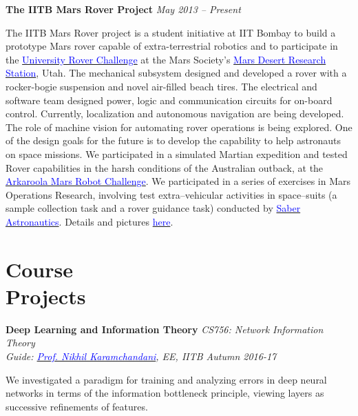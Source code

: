 \documentclass[margin,line]{res}
\newenvironment{list1}{
  \begin{list}{\ding{113}}{%
      \setlength{\itemsep}{0in}
      \setlength{\parsep}{0in} \setlength{\parskip}{0in}
      \setlength{\topsep}{0in} \setlength{\partopsep}{0in} 
      \setlength{\leftmargin}{0.17in}}}{\end{list}}
\begin{document}
\begin{resume}
{\bf The IITB Mars Rover Project}
\hfill {\it May 2013 -- Present} \\
\vspace*{-.13in}
\begin{list1}
\item[]
The IITB Mars Rover project is a student initiative at IIT Bombay to build a prototype Mars rover capable of extra-terrestrial robotics and to participate in the \href{http://urc.marssociety.org/}{\textcolor{blue} {University Rover Challenge}} at the Mars Society's \href{http://mdrs.marssociety.org/}{\textcolor{blue} {Mars Desert Research Station}}, Utah. The mechanical subsystem designed and developed a rover with a rocker-bogie suspension and novel air-filled beach tires. The electrical and software team designed power, logic and communication circuits for on-board control. Currently, localization and autonomous navigation are being developed. The role of machine vision for automating rover operations is being explored. One of the design goals for the future is to develop the capability to help astronauts on space missions. We participated in a simulated Martian expedition and tested Rover capabilities in the harsh conditions of the Australian outback, at the \href{http://marssociety.org.au/article/arkaroola-mars-robot-challenge-spaceward-bound-expedition}{\textcolor{blue} {Arkaroola Mars Robot Challenge}}. We participated in a series of exercises in Mars Operations Research, involving test extra--vehicular activities in space--suits (a sample collection task and a rover guidance task) conducted by \href{https://saberastro.com/}{\textcolor{blue} {Saber Astronautics}}. Details and pictures \href{http://alankarkotwal.github.io/#projects}{\textcolor{blue} {here}}.
\end{list1}

\section{\sc Course \\Projects}
{\bf Deep Learning and Information Theory} \hfill {\it CS756: Network Information Theory} \\
{\em Guide: \href{https://www.ee.iitb.ac.in/~nikhilk/}{\textcolor{blue}{Prof. Nikhil Karamchandani}}, EE, IITB \hfill Autumn 2016-17} \\
\vspace*{-.15in}
\begin{list1}
\item[] We investigated a paradigm for training and analyzing errors in deep neural networks in terms of the information bottleneck principle, viewing layers as successive refinements of features.
\end{list1}


\end{resume}
\end{document}
